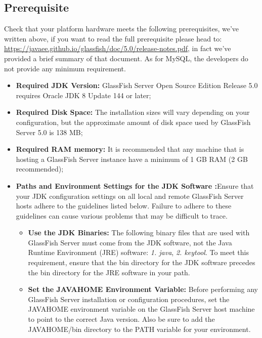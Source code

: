 \subsection{Prerequisite}
\label{subsect:Prerequisite}
Check that your platform hardware meets the following prerequisites, we've written above, if you want to read the full prerequisite please head to: \href{https://javaee.github.io/glassfish/doc/5.0/release-notes.pdf}{\color{blue}https://javaee.github.io/glassfish/doc/5.0/release-notes.pdf}, in fact we've provided a brief summary of that document. As for MySQL, the developers do not provide any minimum requirement. 
\begin{itemize}
	\item \textbf{Required JDK Version:} GlassFish Server Open Source Edition Release 5.0 requires Oracle JDK 8 Update 144 or later;
	\item \textbf{Required Disk Space:} The installation sizes will vary depending on your configuration, but the approximate amount of disk space used by GlassFish Server 5.0 is 138 MB;
	\item \textbf{Required RAM memory:} It is recommended that any machine that is hosting a GlassFish Server instance have a minimum of 1 GB RAM (2 GB recommended); 
	\item \textbf{Paths and Environment Settings for the JDK Software :}Ensure that your JDK configuration settings on all local and remote GlassFish Server hosts adhere to the guidelines listed below. Failure to adhere to these guidelines can cause various problems that may be difficult to trace.
	\begin{itemize}
		\item \textbf{Use the JDK Binaries:} The following binary files that are used with GlassFish Server must come from the JDK software, not the Java Runtime Environment (JRE) software: \textit{1. java}, \textit{2. keytool}. To meet this requirement, ensure that the bin directory for the JDK software precedes the bin directory for the JRE software in your path.
		\item \textbf{Set the JAVA\textunderscore HOME Environment Variable:} Before performing any GlassFish Server installation or configuration procedures, set the JAVA\textunderscore HOME environment variable on the GlassFish Server host machine to point to the correct Java version. Also be sure to add the JAVA\textunderscore HOME/bin directory to the PATH variable for your environment.
	\end{itemize}
\end{itemize}

